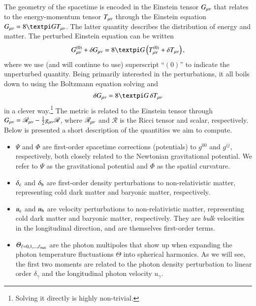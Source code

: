 


The geometry of the spacetime is encoded in the Einstein tensor $G_{\mu \nu}$ that relates to the energy-momentum tensor $T_{\mu \nu}$ through the Einstein equation $G\munu = 8\pi G T\munu$. The latter quantity describes the distribution of energy and matter. The perturbed Einstein equation can be written
\begin{equation}
    G^{(0)}\munu +\delta G\munu = 8\pi G \left( T^{(0)}\munu+\delta T_{\mu \nu} \right),
\end{equation}
where we use (and will continue to use) superscript ``$(0)$'' to indicate the unperturbed quantity. Being primarily interested in the perturbations, it all boils down to using the Boltzmann equation solving and
\begin{equation}\label{mil3:theo:eq:delta_G}
    \delta G\munu = 8\pi G\, \delta T\munu
\end{equation}
in a clever way.\footnote{Solving it directly is highly non-trivial.} The metric is related to the Einstein tensor through $G_{\mu \nu}= \mathscr{R}_{\mu \nu} - \frac{1}{2}g_{\mu \nu} \mathscr{R}$, where $\mathscr{R}_{\mu \nu}$ and $\mathscr{R}$ is the Ricci tensor and scalar, respectively. 
Below is presented a short description of the quantities we aim to compute. 
\begin{itemize}
    \item $\Psi$ and $\Phi$ are first-order spacetime corrections (potentials) to $g^{00}$ and $g^{ij}$, respectively, both closely related to the Newtonian gravitational potential. We refer to $\Psi$ as the gravitational potential and $\Phi$ as the spatial curvature.
    \item $\delta_\mathrm{c}$ and $\delta_\mathrm{b}$ are first-order density perturbations to non-relativistic matter, representing cold dark matter and baryonic matter, respectively.
    \item $u_\mathrm{c}$ and $u_\mathrm{b}$ are velocity perturbations to non-relativistic matter, representing cold dark matter and baryonic matter, respectively. They are \textit{bulk} velocities in the longitudinal direction, and are themselves first-order terms.
    \item $\varTheta_{\ell= 0, 1, \dots, \ell_\mathrm{max}}$ are the photon multipoles that show up when expanding the photon temperature fluctuations $\Theta$ into spherical harmonics. As we will see, the first two moments are related to the photon density perturbation to linear order $\delta_\gamma$ and the longitudinal photon velocity $u_\gamma$.
\end{itemize}

